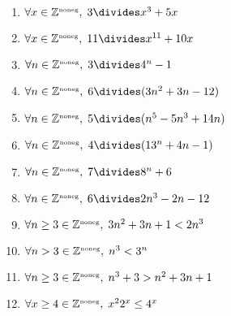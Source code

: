 \begin{enumerate}
{\begin{proof}
\end{proof}
}
\wbvfill


\item $\forall x \in \Naturals, \; 3 \divides x^3+5x$

\wbvfill

\workbookpagebreak

\item $\forall x \in \Naturals, \; 11 \divides x^{11}+10x$

\wbvfill


\item $\forall n \in \Naturals, \; 3 \divides 4^n-1$

\wbvfill

\workbookpagebreak

\item $\forall n \in \Naturals, \; 6 \divides (3n^{2}+3n-12)$

\wbvfill


\item $\forall n \in \Naturals, \; 5 \divides (n^{5}-5n^{3}+14n)$

\wbvfill

\workbookpagebreak

\item $\forall n \in \Naturals, \; 4 \divides (13^{n}+4n-1)$

\wbvfill


\item $\forall n \in \Naturals, \; 7 \divides 8^n+6$

\wbvfill

\workbookpagebreak

\item $\forall n \in \Naturals, \; 6 \divides 2n^3 - 2n - 12$

\wbvfill


\item $\forall n \geq 3 \in {\mathbb Z}^{\mbox{\tiny noneg}}, \; 3n^2+3n+1 < 2n^3$

\wbvfill

\workbookpagebreak

\item $\forall n > 3 \in {\mathbb Z}^{\mbox{\tiny noneg}}, \; n^3 < 3^n$

\wbvfill


\item $\forall n \geq 3 \in {\mathbb Z}^{\mbox{\tiny noneg}}, \; n^{3}+3>n^{2}+3n+1$

\wbvfill

\workbookpagebreak

\item $\forall x \geq 4 \in {\mathbb Z}^{\mbox{\tiny noneg}}, \; x^22^x \leq 4^x$

\wbvfill


\end{enumerate}


